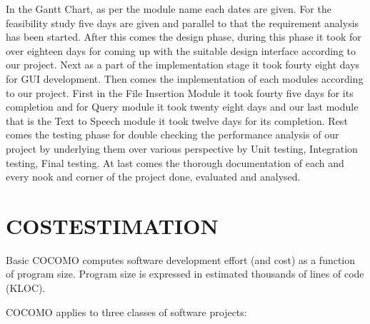 \documentclass[12pt,a4paper,oneside]{report}
\begin{document}
In the Gantt Chart, as per the module name each dates are given. For the feasibility study ﬁve days are given and parallel to that the requirement analysis has been started. After this comes the design phase, during this phase it took for over eighteen days for coming up with the suitable design interface according to our project. Next as a part of the implementation stage it took fourty eight days for GUI development. Then comes the implementation of each modules according to our project. First in the File Insertion Module it took fourty ﬁve days for its completion and for Query module it took twenty eight days and our last module that is the Text to Speech module it took twelve days for its completion. Rest comes the testing phase for double checking the performance analysis of our project by underlying them over various perspective by Unit testing, Integration testing, Final testing. At last comes the thorough documentation of each and every nook and corner of the project done, evaluated and analysed.

\section{COSTESTIMATION}
\par Basic COCOMO computes software development effort (and cost) as a function of program size. Program size is expressed in estimated thousands of lines of code (KLOC).\\
\par COCOMO applies to three classes of software projects:\\
\end{document}
